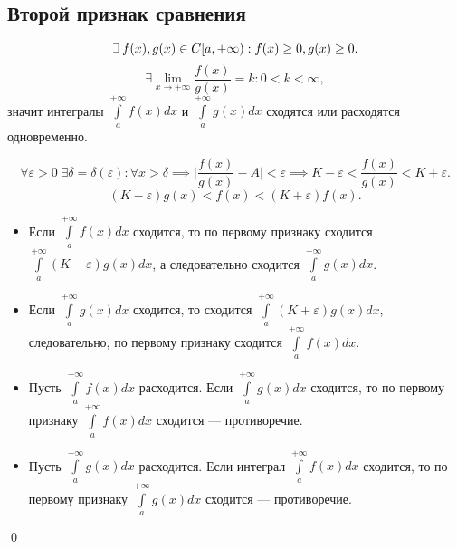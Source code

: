 \documentclass[a4paper,12pt,oneside]{extbook}
\def\lets{%
    \mathord{\setbox0=\hbox{$\exists$}%
        \hbox{\kern 0.125\wd0%
            \vbox to \ht0{%
                \hrule width 0.75\wd0%
                \vfill%
                \hrule width 0.75\wd0}%
            \vrule height \ht0%
            \kern 0.125\wd0}%
    }%
    \hspace{2pt}
}
\theoremstyle{numbered}
\theoremstyle{unnumbered}
\theoremstyle{named}
\theoremstyle{unnumbered}
\theoremstyle{named}
\theoremstyle{named}
\theoremstyle{named}
\renewenvironment{proof}{{\noindent\textbf{Доказательство.}}}{\qed}
\begin{document}
\subsection{Второй признак сравнения}%
\label{sub:Второй признак сравнения}

\begin{equation}
    \lets f(x), g(x) \in C [a, +\infty): f(x) \geq 0, g(x) \geq 0.
\end{equation}
\begin{equation}
    \exists \lim_{x \to +\infty} \frac{f(x)}{g(x)} = k: 0 < k < \infty,
\end{equation}
значит интегралы \(\int\limits_{a}^{+\infty} f(x)dx\) и \(\int\limits_{a}^{+\infty} g(x)dx\)  сходятся или расходятся одновременно.

\begin{proof}
    \begin{equation}
        \forall \varepsilon > 0 \; \exists \delta = \delta(\varepsilon): \forall x > \delta \implies \Big| \frac{f(x)}{g(x)} - A \Big| < \varepsilon
        \implies
        K - \varepsilon < \frac{f(x)}{g(x)} < K + \varepsilon.
    \end{equation}
    \begin{equation}
        (K - \varepsilon) g(x) < f(x) < (K + \varepsilon) f(x).
    \end{equation}

    \begin{itemize}
        \item Если \(\int\limits_{a}^{+\infty} f(x)dx\) сходится, то по первому признаку сходится \(\int\limits_{a}^{+\infty} (K - \varepsilon) g(x)dx\), а следовательно сходится \(\int\limits_{a}^{+\infty} g(x)dx\).
        \item Если \(\int\limits_{a}^{+\infty} g(x)dx\) сходится, то сходится \(\int\limits_{a}^{+\infty} (K + \varepsilon) g(x)dx\), следовательно, по первому признаку сходится \(\int\limits_{a}^{+\infty} f(x)dx\).
        \item Пусть \(\int\limits_{a}^{+\infty} f(x)dx\) расходится. Если \(\int\limits_{a}^{+\infty} g(x)dx\) сходится, то по первому признаку \(\int\limits_{a}^{+\infty} f(x)dx\) сходится — противоречие.
        \item Пусть \(\int\limits_{a}^{+\infty} g(x)dx\) расходится. Если интеграл \(\int\limits_{a}^{+\infty} f(x)dx\) сходится, то по первому признаку \(\int\limits_{a}^{+\infty} g(x)dx\) сходится — противоречие.
    \end{itemize}
\end{proof}
\end{document}
